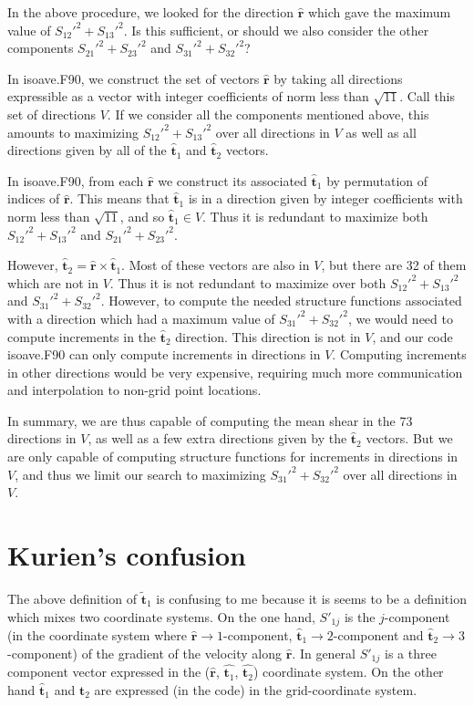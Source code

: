 \documentclass[12pt]{article}
\begin{document}
In the above procedure, we looked for the direction $ \bm{{\hat r}}$
which gave the maximum value of $S_{12}'^2 + S_{13}'^2$.  
Is this sufficient, or should we also consider the other
components $S_{21}'^2 + S_{23}'^2$ and 
$S_{31}'^2 + S_{32}'^2$?  

In isoave.F90, we construct the set of vectors $\bm{{\hat r}}$ 
by taking all directions expressible as a vector with integer
coefficients of norm less than $\sqrt{11}$. Call this set
of directions $V$.   If we consider all the components mentioned
above, this amounts to maximizing $S_{12}'^2 + S_{13}'^2$ over
all directions in $V$ as well as all directions given by
all of the $\bm{{\hat t}}_1$ and $\bm{{\hat t}}_2$ vectors.

In isoave.F90, from each $\bm{{\hat r}}$ we construct its associated
$\bm{{\hat t}}_1$ by permutation of indices of $\bm{{\hat r}}$.
This means that $\bm{{\hat t}}_1$ is in a direction given by integer coefficients
with norm less than $\sqrt{11}$, and so $\bm{{\hat t}}_1 \in V$.  
Thus it is redundant to maximize
both $S_{12}'^2 + S_{13}'^2$ and $S_{21}'^2 + S_{23}'^2$.

However, $\bm{{\hat t}}_2 = \bm{{\hat r}} \times \bm{{\hat t}}_1$.
Most of these vectors are also in $V$, but there are 32 of them 
which are not in $V$.  Thus it is not redundant to maximize over
both $S_{12}'^2 + S_{13}'^2$ and $S_{31}'^2 + S_{32}'^2$.
However, to compute the needed structure functions associated with
a direction which had a maximum value of $S_{31}'^2 + S_{32}'^2$, we
would need to compute increments in the $\bm{{\hat t}}_2$ direction.
This direction is not in $V$, and our code isoave.F90 can only 
compute increments in directions in $V$.  Computing increments in
other directions would be very expensive, requiring much more communication
and interpolation to non-grid point locations.

In summary, we are thus capable of computing the mean shear in
the 73 directions in $V$, as well as a few extra directions given by the
$\bm{{\hat t}}_2$ vectors.   But we are only capable of computing
structure functions for increments in directions in $V$, and thus
we limit our search to maximizing $S_{31}'^2 + S_{32}'^2$ over
all directions in $V$.  


\section*{Kurien's confusion}

The above definition of $\bm{{\tilde t}}_1$ is confusing to me because
it is seems to be a definition which mixes two coordinate systems. On
the one hand, $S'_{1j}$ is the $j$-component (in the coordinate system
where $\hat{\bm{ r}} \rightarrow 1$-component, $\hat{\bm{t}}_1
\rightarrow 2$-component and $\hat{\bm{ t}}_2 \rightarrow
3$-component) of the gradient of the velocity along $\hat{\bm{
r}}$. In general $S'_{1j}$ is a three component vector expressed in
the ($\hat{\bm{ r}}$, $\hat{\bm{t}_1}$, $\hat{\bm{t}_2}$) coordinate
system. On the other hand $\hat{\bm{t}}_1$ and $\hat{\bm{t}}_2$ are
expressed (in the code) in the grid-coordinate system.
\end{document}
